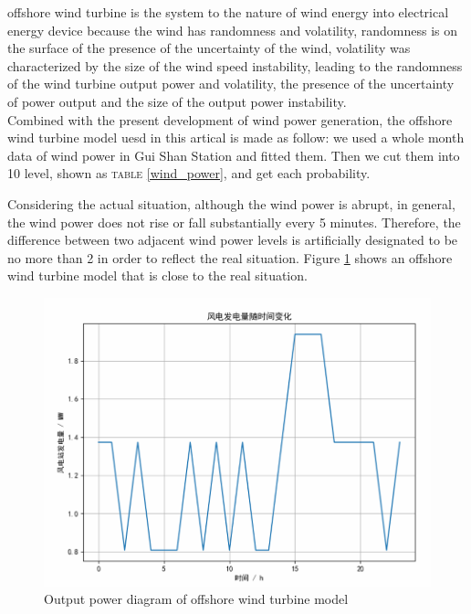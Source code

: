 \documentclass[journal,onecolumn]{IEEEtran}
\begin{document}
 offshore wind turbine is the system to the nature of wind energy into electrical energy device because the wind has randomness and volatility, randomness is on the surface of the presence of the uncertainty of the wind, volatility was characterized by the size of the wind speed instability, leading to the randomness of the wind turbine output power and volatility, the presence of the uncertainty of power output and the size of the output power instability.\\

Combined with the present development of wind power generation, the offshore wind turbine model uesd in this artical is made as follow:
we used a whole month data of wind power in Gui Shan Station and fitted them. Then we cut them into 10 level, shown as \textsc{table} \ref{wind_power}, and get each probability.


\begin{table}[h]
	\centering
	\caption{The wind level and its probability\cite{b8}}
	\label{wind_power}
\end{table}

Considering the actual situation, although the wind power is abrupt, in general, the wind power does not rise or fall substantially every 5 minutes. Therefore, the difference between two adjacent wind power levels is artificially designated to be no more than 2 in order to reflect the real situation. Figure \ref{fig:screenshot002} shows an offshore wind turbine model that is close to the real situation.


\begin{figure}[h]
	\centering
	\includegraphics[width=0.7\linewidth]{pictures/screenshot002}
	\caption{Output power diagram of offshore wind turbine model}
	\label{fig:screenshot002}
\end{figure}
\end{document}
